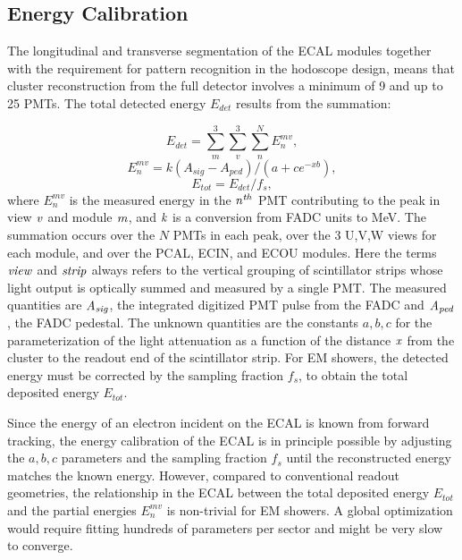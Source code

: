 \subsection{Energy Calibration}

The longitudinal and transverse segmentation of the ECAL modules together with the requirement for pattern
recognition in the hodoscope design, means that cluster reconstruction from the full detector involves a minimum
of 9 and up to 25 PMTs. The total detected energy $E_{det}$ results from the summation:

\begin{equation}
 E_{det} = \sum_{m}^{3} \sum_{v}^{3} \sum_{n}^{N} E_{n}^{mv},\label{eq:E1}
\end{equation}
\begin{equation}
 E_{n}^{mv} = k(A_{sig}-A_{ped})/(a+c e^{-xb}),   \label{eq:E2}
\end{equation}
\begin{equation}
 E_{tot} = E_{det}/f_{s},                 \label{eq:E3}
\end{equation}
where $E_{n}^{mv}$ is the measured energy in the ${\it n^{th}}$ PMT contributing to the peak in view ${\it v}$ and
module ${\it m}$, and ${\it k}$ is a conversion from FADC units to MeV. The summation occurs over the $N$ PMTs
in each peak, over the 3 U,V,W views for each module, and over the PCAL, ECIN, and ECOU modules. Here the terms $\it{view}$ and $\it{strip}$ always refers to 
the vertical grouping of scintillator strips whose light output is optically summed and measured by a single PMT.  The measured
quantities are ${\it A_{sig}}$, the integrated digitized PMT pulse from the FADC and ${\it A_{ped}}$, the FADC
pedestal. The unknown quantities are the constants $a,b,c$ for the parameterization of the light attenuation as a
function of the distance ${\it x}$ from the cluster to the readout end of the scintillator strip. For EM showers, the
detected energy must be corrected by the sampling fraction $f_{s}$, to obtain the total deposited energy $E_{tot}$.  

Since the energy of an electron incident on the ECAL is known from forward tracking, the energy calibration of the
ECAL is in principle possible by adjusting the $a,b,c$ parameters and the sampling fraction $f_{s}$ until the
reconstructed energy matches the known energy. However, compared to conventional readout geometries, the
relationship in the ECAL between the total deposited energy $E_{tot}$ and the partial energies $E_{n}^{mv}$ is
non-trivial for EM showers. A global optimization would require fitting hundreds of parameters per sector and might
be very slow to converge.

